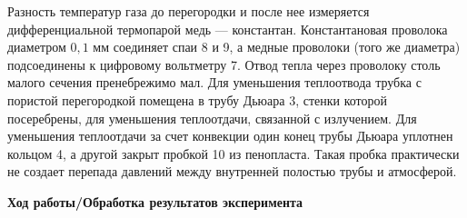 \documentclass[a4paper, 12pt]{article}
\begin{document}
    Разность температур газа до перегородки и после нее измеряется дифференциальной термопарой медь — константан. Константановая проволока диаметром $0,1 \text{ мм}$ соединяет спаи 8 и 9, а медные проволоки (того же диаметра) подсоединены к цифровому вольтметру 7. Отвод тепла через проволоку столь малого сечения пренебрежимо мал. Для уменьшения теплоотвода трубка с пористой перегородкой помещена в трубу Дьюара 3, стенки которой посеребрены, для уменьшения теплоотдачи, связанной с излучением. Для уменьшения теплоотдачи за счет конвекции один конец трубы Дьюара уплотнен кольцом 4, а другой закрыт пробкой 10 из пенопласта. Такая пробка практически не создает перепада давлений между внутренней полостью трубы и атмосферой.\\
    
    \begin{flushleft}
        {\Large {\bf Ход работы/Обработка результатов эксперимента}}
    \end{flushleft}
    
\end{document}
